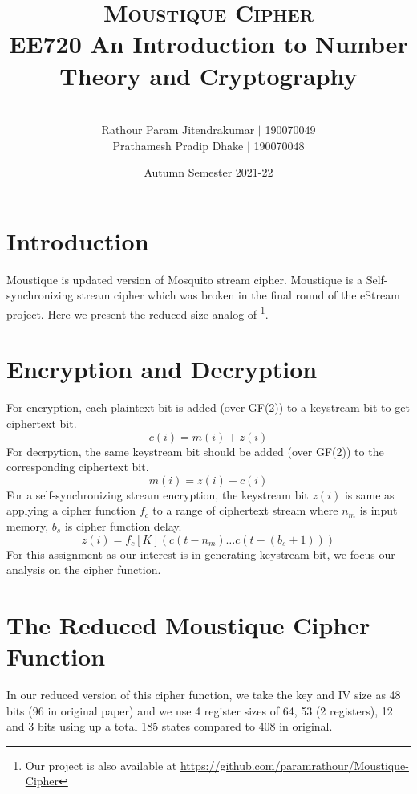 \documentclass[a4paper,10pt]{article}
\title{\vspace*{-2em}\textsc{Moustique Cipher}\\[0.5em]\Large{{EE720 {An Introduction to Number Theory and Cryptography}}}}
\author{\\[-3em]Rathour Param Jitendrakumar $\vert$ 190070049\\Prathamesh Pradip
Dhake $\vert$ 190070048}
\date{\vspace*{-1em}Autumn Semester 2021-22}
\begin{document}
\maketitle
\tableofcontents
\section{Introduction}
Moustique\cite{v3} is updated version of Mosquito\cite{v2} stream cipher. Moustique is a Self-synchronizing stream cipher which was broken in the final round of the eStream project. Here we present the reduced size analog of \cite{v3}\footnote{Our project is also available at \url{https://github.com/paramrathour/Moustique-Cipher}}.
\section{Encryption and Decryption}
For encryption, each plaintext bit is added (over GF(2)) to a keystream bit to get ciphertext bit.
\begin{equation}
    c(i) = m(i) + z(i)
\end{equation}
For decrpytion, the same keystream bit should be added (over GF(2)) to the corresponding ciphertext bit.
\begin{equation}
    m(i) = z(i) + c(i)
\end{equation}
For a self-synchronizing stream encryption, the keystream bit $z(i)$ is same as applying a cipher function $f_c$ to a range of ciphertext stream where $n_m$ is input memory, $b_s$ is cipher function delay.
\begin{equation}
    z(i) = f_c[K](c(t-n_m)\ldots c(t-(b_s+1)))
\end{equation}
For this assignment as our interest is in generating keystream bit, we focus our analysis on the cipher function.
\section{The Reduced Moustique Cipher Function}
In our reduced version of this cipher function, we take the key and IV size as 48 bits (96 in original paper) and we use 4 register sizes of 64, 53 (2 registers), 12 and 3 bits using up a total 185 states compared to 408 in original.
\end{document}
